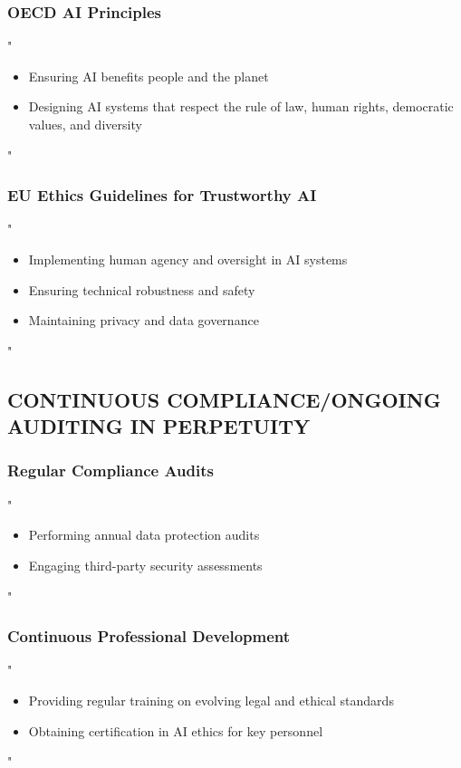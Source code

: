 \documentclass[14pt,a4paper]{article}
\begin{document}
\textit{\parencite{UNESCO2021}}

\subsubsection*{OECD AI Principles}
"
\begin{itemize}
    \item Ensuring AI benefits people and the planet
    \item Designing AI systems that respect the rule of law, human rights, democratic values, and diversity
\end{itemize}
"

\textit{\parencite{OECD2024}}

\subsubsection*{EU Ethics Guidelines for Trustworthy AI}
"
\begin{itemize}
    \item Implementing human agency and oversight in AI systems
    \item Ensuring technical robustness and safety
    \item Maintaining privacy and data governance
\end{itemize}
"

\textit{\parencite{EC2024}}

\subsection*{CONTINUOUS COMPLIANCE/ONGOING AUDITING IN PERPETUITY}

\subsubsection*{Regular Compliance Audits}
"
\begin{itemize}
    \item Performing annual data protection audits
    \item Engaging third-party security assessments
\end{itemize}
"

\textit{\parencite{ICO2024}}

\subsubsection*{Continuous Professional Development}
"
\begin{itemize}
    \item Providing regular training on evolving legal and ethical standards
    \item Obtaining certification in AI ethics for key personnel
\end{itemize}
"

\textit{\parencite{CIPD2024}}


\newpage

\printbibliography
\end{document}
